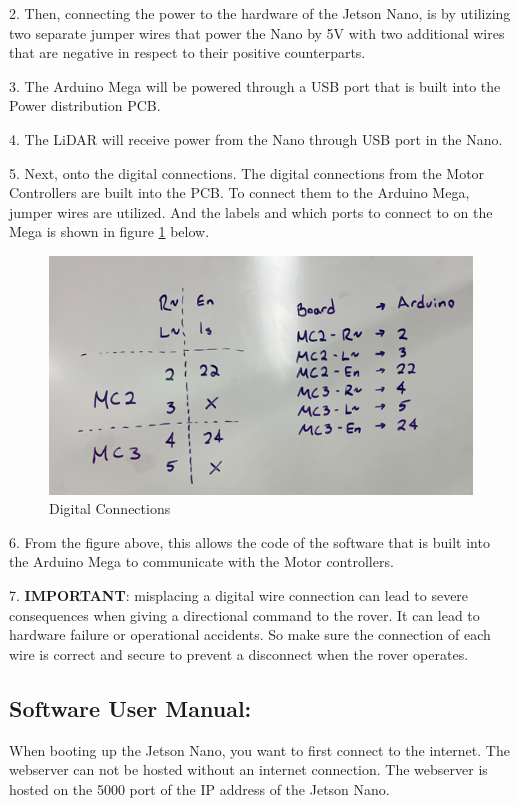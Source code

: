 \documentclass[a4paper, 10pt]{article}
\begin{document}
2. Then, connecting the power to the hardware of the Jetson Nano, is by utilizing two separate jumper wires that power the Nano by 5V with two additional wires that are negative in respect to their positive counterparts.  

3. The Arduino Mega will be powered through a USB port that is built into the Power distribution PCB.

4. The LiDAR will receive power from the Nano through USB port in the Nano.

5. Next, onto the digital connections. The digital connections from the Motor Controllers are built into the PCB. To connect them to the Arduino Mega, jumper wires are utilized. And the labels and which ports to connect to on the Mega is shown in figure \ref{dig_con} below.

	\begin{figure} [!h]
			\centering
			\includegraphics[scale=0.5]{Photos/Digital Connections from Motor Controller to Arduino Mega}
			\caption{Digital Connections}
			\label{dig_con}
	\end{figure}

6. From the figure above, this allows the code of the software that is built into the Arduino Mega to communicate with the Motor controllers.

7. \textbf{IMPORTANT}: misplacing a digital wire connection can lead to severe consequences when giving a directional command to the rover. It can lead to hardware failure or operational accidents. So make sure the connection of each wire is correct and secure to prevent a disconnect when the rover operates.

\subsection{Software User Manual:}
    When booting up the Jetson Nano, you want to first connect to the internet. The webserver can not be hosted without an internet connection. The webserver is hosted on the 5000 port of the IP address of the Jetson Nano. 
    
\end{document}
